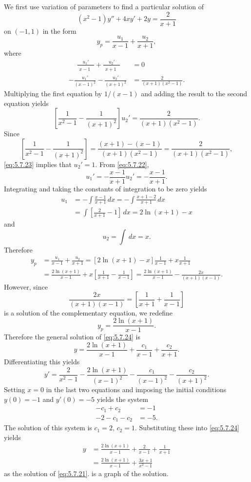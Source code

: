 \begin{solution}
We first use variation of parameters to find a particular solution
of
\[
(x^2-1)y''+4xy'+2y=\frac{2}{x+1}
\]
on $(-1,1)$ in the form
\[
y_p=\frac{u_1}{x-1}+\frac{u_2}{x+1},
\]
where
\begin{align}
\phantom{-}\frac{u_1'}{\phantom{(}x-1\phantom{)^2}}+\frac{u_2'}{\phantom{(}x+1\phantom{)^2}}
&=0\label{eq:5.7.22}\\
-\frac{u_1'}{(x-1)^2}-\frac{u_2'}{(x+1)^2}
&=\frac{2}{(x+1)(x^2-1)}.\nonumber
\end{align}
Multiplying the first equation by $1/(x-1)$ and adding the result to
the second equation yields
\begin{equation} \label{eq:5.7.23}
\left[\frac{1}{x^2-1}-\frac{1}{(x+1)^2}\right]u_2'=\frac{2}{(x+1)(x^2-1)}.
\end{equation}
Since
\[
\left[\frac{1}{x^2-1}-\frac{1}{(x+1)^2}\right]=\frac{(x+1)-(x-1)}{(x+1)(x^2-1)}
=\frac{2}{(x+1)(x^2-1)},
\]
\eqref{eq:5.7.23} implies that $u_2'=1$. From \eqref{eq:5.7.22},
\[
u_1'=-\frac{x-1}{x+1}u_2'=-\frac{x-1}{x+1}.
\]
Integrating and taking the constants of integration to be zero yields
\begin{align*}
u_1&=-\int\frac{x-1}{x+1}\,dx=-\int\frac{x+1-2}{x+1}\,dx \\
&=\int\left[\frac{2}{x+1}-1\right]\,dx=2\ln(x+1)-x
\end{align*}
and
\[
u_2=\int\,dx=x.
\]
Therefore
\begin{align*}
y_p&=\frac{u_1}{x-1}+\frac{u_2}{x+1}=\left[2\ln(x+1)-x\right]\frac{1}{x-1}
+x\frac{1}{x+1} \\
&=\frac{2\ln(x+1)}{x-1}+x\left[\frac{1}{x+1}-\frac{1}{x-1}\right]
=\frac{2\ln(x+1)}{x-1}-\frac{2x}{(x+1)(x-1)}.
\end{align*}
However, since
\[
\frac{2x}{(x+1)(x-1)}=\left[\frac{1}{x+1}+\frac{1}{x-1}\right]
\]
is a solution of the complementary equation, we redefine
\[
y_p=\frac{2\ln(x+1)}{x-1}.
\]
Therefore  the general solution of  \eqref{eq:5.7.24} is
\begin{equation} \label{eq:5.7.24}
y=\frac{2\ln(x+1)}{x-1}+\frac{c_1}{x-1}+\frac{c_2}{x+1}.
\end{equation}
Differentiating this yields
\[
y'=\frac{2}{x^2-1}-\frac{2\ln(x+1)}{(x-1)^2}-\frac{c_1}{(x-1)^2}-\frac{c_2}{(x+1)^2}.
\]
Setting $x=0$ in the last two equations and imposing the initial conditions
$y(0)=-1$ and $y'(0)=-5$ yields the system
\begin{align*}
-c_1+c_2&=-1\phantom{.}\\
-2-c_1-c_2&=-5.
\end{align*}
The solution of this system is $c_1=2,\,c_2=1$.  Substituting
these into
\eqref{eq:5.7.24} yields
\begin{align*}
y&=\frac{2\ln(x+1)}{x-1}+\frac{2}{x-1}+\frac{1}{x+1}\\
&=\frac{2\ln(x+1)}{x-1}+\frac{3x+1}{x^2-1}
\end{align*}
as the solution of  \eqref{eq:5.7.21}.  is a graph
of the solution.
\end{solution}

